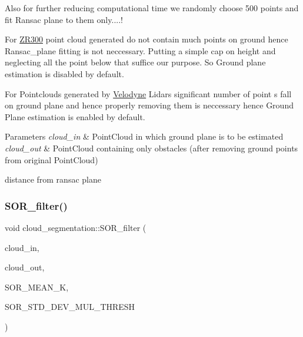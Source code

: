 Also for further reducing computational time we randomly choose 500 points and fit Ransac plane to them only....!

For \hyperlink{classZR300}{Z\+R300} point cloud generated do not contain much points on ground hence Ransac\+\_\+plane fitting is not neccessary. Putting a simple cap on height and neglecting all the point below that suffice our purpose. So Ground plane estimation is disabled by default.

For Pointclouds generated by \hyperlink{classVelodyne}{Velodyne} Lidars significant number of point s fall on ground plane and hence properly removing them is neccessary hence Ground Plane estimation is enabled by default.


\begin{DoxyParams}{Parameters}
{\em cloud\+\_\+in} & Point\+Cloud in which ground plane is to be estimated \\
\hline
{\em cloud\+\_\+out} & Point\+Cloud containing only obstacles (after removing ground points from original Point\+Cloud) \\
\hline
\end{DoxyParams}
distance from ransac plane \mbox{\label{classdatmo_1_1cloud__segmentation_a169ebef33c020301b83261ee2d3f49df}} 
\subsubsection{\texorpdfstring{S\+O\+R\+\_\+filter()}{SOR\_filter()}}
{\footnotesize\ttfamily void cloud\+\_\+segmentation\+::\+S\+O\+R\+\_\+filter (\begin{DoxyParamCaption}\item[{const pcl\+::\+Point\+Cloud$<$ pcl\+::\+Point\+X\+YZ $>$\+::Ptr \&}]{cloud\+\_\+in,  }\item[{const pcl\+::\+Point\+Cloud$<$ pcl\+::\+Point\+X\+YZ $>$\+::Ptr \&}]{cloud\+\_\+out,  }\item[{float}]{S\+O\+R\+\_\+\+M\+E\+A\+N\+\_\+K,  }\item[{float}]{S\+O\+R\+\_\+\+S\+T\+D\+\_\+\+D\+E\+V\+\_\+\+M\+U\+L\+\_\+\+T\+H\+R\+E\+SH }\end{DoxyParamCaption})\hspace{0.3cm}{\ttfamily [private]}}

